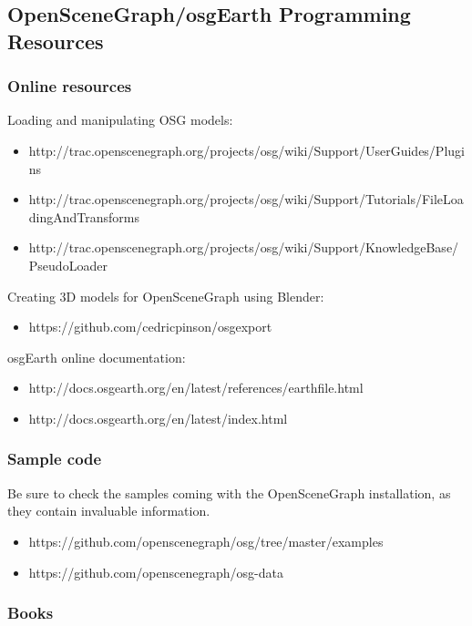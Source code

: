\subsection{OpenSceneGraph/osgEarth Programming Resources}
\label{sec:graphics:osg-osgearth-programming-resources}

\subsubsection{Online resources}
\label{sec:graphics:osg-osgearth-online-resources}

Loading and manipulating OSG models:
\begin{itemize}
\item http://trac.openscenegraph.org/projects/osg/wiki/Support/UserGuides/Plugins
\item http://trac.openscenegraph.org/projects/osg/wiki/Support/Tutorials/FileLoadingAndTransforms
\item http://trac.openscenegraph.org/projects/osg/wiki/Support/KnowledgeBase/PseudoLoader
\end{itemize}

Creating 3D models for OpenSceneGraph using Blender:
\begin{itemize}
\item https://github.com/cedricpinson/osgexport
\end{itemize}

osgEarth online documentation:
\begin{itemize}
\item http://docs.osgearth.org/en/latest/references/earthfile.html
\item http://docs.osgearth.org/en/latest/index.html
\end{itemize}

\subsubsection{Sample code}
\label{sec:graphics:osg-osgearth-samples}

Be sure to check the samples coming with the OpenSceneGraph installation, as
they contain invaluable information.
\begin{itemize}
\item https://github.com/openscenegraph/osg/tree/master/examples
\item https://github.com/openscenegraph/osg-data
\end{itemize}

\subsubsection{Books}
\label{sec:graphics:osg-osgearth-books}

